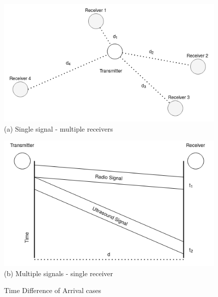 \begin{figure} [H]
    \centering
    \begin{minipage}{.5\textwidth}
      \centering
      \includegraphics[width=\linewidth]{../Photos/tdoa-multiple.png}
      {(a) Single signal - multiple receivers}
    \end{minipage}%
    \begin{minipage}{.5\textwidth}
      \centering
      \includegraphics[width=\linewidth]{../Photos/tdoa-timing.png}
      {(b) Multiple signals - single receiver}
    \end{minipage}
    \hfill \break
    \decoRule
    \caption[Time Difference of Arrival cases]{Time Difference of Arrival cases}
    \label{fig:Time-Difference-of-Arrival-cases}
\end{figure}

